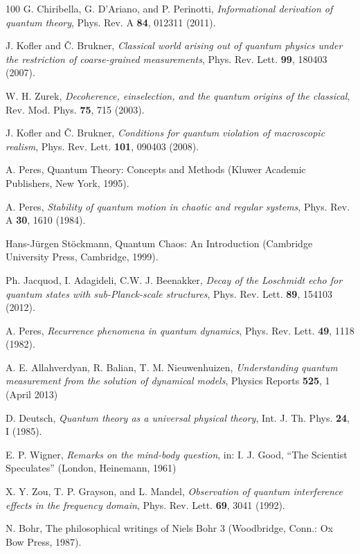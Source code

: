\documentclass[12pt,a4]{article}
\begin{document}
\begin {thebibliography}{100}
 G. Chiribella, G. D'Ariano, and P. Perinotti, {\it Informational derivation of quantum theory}, Phys. Rev. A {\bf 84}, 012311 (2011).

 J. Kofler and {\v C}. Brukner, {\it Classical world arising out of quantum physics under the restriction of coarse-grained measurements}, Phys. Rev. Lett. {\bf 99}, 180403 (2007).

 W. H. Zurek, {\it Decoherence, einselection, and the quantum origins of the classical}, Rev. Mod. Phys. {\bf 75}, 715 (2003).


 J. Kofler and {\v C}. Brukner, {\it Conditions for quantum violation of macroscopic realism}, Phys. Rev. Lett. {\bf 101}, 090403 (2008).

 A. Peres, Quantum Theory: Concepts and Methods (Kluwer Academic Publishers, New York, 1995).

 A. Peres, {\it Stability of quantum motion in chaotic and regular systems}, Phys. Rev. A {\bf 30}, 1610 (1984).

 Hans-J{\"u}rgen St{\"o}ckmann, Quantum Chaos: An Introduction (Cambridge University Press, Cambridge, 1999).

 Ph. Jacquod, I. Adagideli, C.W. J. Beenakker, {\it Decay of the Loschmidt echo for quantum states with sub-Planck-scale structures}, Phys. Rev. Lett. {\bf 89}, 154103 (2012). 

 A. Peres, {\it Recurrence phenomena in quantum dynamics}, Phys. Rev. Lett. {\bf 49}, 1118 (1982).

 A. E. Allahverdyan, R. Balian, T. M. Nieuwenhuizen,
{\it Understanding quantum measurement from the solution of dynamical models}, Physics Reports {\bf 525}, 1 (April 2013)

 D. Deutsch, {\it Quantum theory as a universal physical theory}, Int. J. Th. Phys. {\bf 24}, I  (1985).

 E. P. Wigner, {\it Remarks on the mind-body question}, in: I. J. Good, ``The Scientist Speculates'' (London, Heinemann, 1961)

 X. Y. Zou, T. P. Grayson, and L. Mandel, {\it Observation of quantum interference effects in the frequency domain}, Phys. Rev. Lett. {\bf 69}, 3041 (1992).

 N. Bohr, The philosophical writings of Niels Bohr 3 (Woodbridge, Conn.: Ox Bow Press, 1987).


\end{thebibliography}
\end{document}
